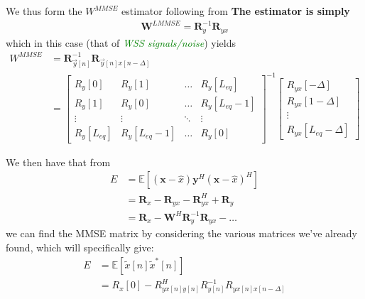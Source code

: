 \documentclass[a4paper, 12pt]{book}
\begin{document}
We thus form the $W^{MMSE}$ estimator following from
\textbf{The estimator is simply}
\begin{align}
    \mathbf{W}^{LMMSE} = \mathbf{R}_y^{-1} \mathbf{R}_{yx} \label{eq:1.224}
\end{align}
which in this case (that of \textit{\textcolor{green}{WSS signals/noise}}) yields
\begin{align}
    W^{MMSE} &= \mathbf{R}_{\vec{y}[n]}^{-1} \mathbf{R}_{\vec{y}[n]x[n-\Delta]} \label{eq:3.102} \\
    &= \begin{bmatrix}
        R_y[0] & R_y[1] & \dots & R_y[L_{eq}] \\
        R_y[1] & R_y[0] & \dots & R_y[L_{eq}-1] \\
        \vdots & \vdots & \ddots & \vdots \\
        R_y[L_{eq}] & R_y[L_{eq}-1] & \dots & R_y[0]
    \end{bmatrix}^{-1}
    \begin{bmatrix}
        R_{yx}[-\Delta] \\
        R_{yx}[1-\Delta] \\
        \vdots \\
        R_{yx}[L_{eq}-\Delta]
    \end{bmatrix} \label{eq:2.163}
\end{align}

We then have that from
\begin{align}
    E &= \mathbb{E}[(\mathbf{x}-\hat{x})\mathbf{y}^H(\mathbf{x}-\hat{x})^H] \label{eq:1.241} \\
    &= \mathbf{R}_x - \mathbf{R}_{yx} - \mathbf{R}_{yx}^H + \mathbf{R}_y \label{eq:1.242} \\
    &= \mathbf{R}_x - \mathbf{W}^H \mathbf{R}_y^{-1} \mathbf{R}_{yx} - \dots \label{eq:1.243}
\end{align}
we can find the MMSE matrix by considering the various matrices we've already found, which will specifically give:
\begin{align}
    E &= \mathbb{E}[\tilde{x}[n]\tilde{x}^*[n]] \label{eq:2.164} \\
    &= R_x[0] - R_{yx[n]y[n]}^H R_{y[n]}^{-1} R_{yx[n]x[n-\Delta]} \label{eq:2.165}
\end{align}

\noindent\setlength{\fboxsep}{10pt}\setlength{\fboxrule}{0.5pt}
\vspace{1em}
\end{document}
